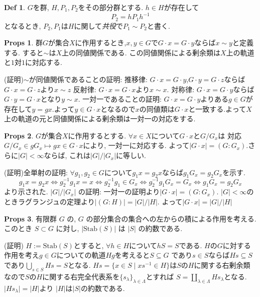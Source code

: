 \documentclass[dvipdfmx]{jsarticle}
\theoremstyle{definition}
\newtheorem{props}{Props}
\newtheorem{definition}{Def}
\numberwithin{equation}{section}
\numberwithin{props}{section}
\numberwithin{definition}{section}
\numberwithin{note}{section}
\newcommand{\Stab}{\mathrm{Stab}}
\begin{document}
\begin{definition}
     $G$を群, $H,P_1,P_2$をその部分群とする. $h\in H$が存在して
     $$
          P_2=hP_1h^{-1}
     $$
     となるとき, $P_2,P_1$は$H$に関して\emph{共役}で$P_1\sim P_2$と書く.
\end{definition}


\begin{props}
     群$G$が集合$X$に作用するとき,$x,y\in G$で$G\cdot x=G\cdot y$ならば$x\sim y$と定義する. すると$\sim$は$X$上の同値関係である. この同値関係による剰余類は$X$上の軌道と$1$対$1$に対応する.
\end{props}
(証明)$\sim$が同値関係であることの証明:
推移律:  $G\cdot x=G\cdot y$,$G\cdot y=G\cdot z$ならば$G\cdot x=G\cdot z$より$x\sim z$
反射律: $G\cdot x=G\cdot x$より$x\sim x$.
対称律: $G\cdot x=G\cdot y$ならば$G\cdot y=G\cdot x$となり$y\sim x$.
一対一であることの証明:
$G\cdot x=G\cdot y$よりある$g\in G$が存在して$y=gx$.よって$y\in G\cdot x$となるので$x$の同値類は$G\cdot x$と一致する.よって$X$上の軌道の元と同値関係による剰余類は一対一の対応をする.

\begin{props}
     $G$が集合$X$に作用するとする. $\forall x \in X$について$G\cdot x$と$G/G_x$は
     対応$G/G_x \in gG_x \mapsto gx\in G\cdot x$により, 一対一に対応する. よって$\lvert G\cdot x\rvert=(G:G_x)$.さらに$\lvert G\rvert<\infty$ならば, これは$\lvert G\rvert/\lvert G_x\rvert$に等しい.
\end{props}
(証明)全単射の証明:
$\forall g_1 ,g_2 \in G$について$g_1x=g_2x$ならば$g_1G_x=g_2G_x$を示す.
$$
     g_1x=g_2x \iff g^{-1}_2g_1 x =x\iff g^{-1}_2g_1\in G_x \iff g^{-1}_2g_1G_x=G_x \iff g_1G_x=g_2G_x
$$
より示された.
$\lvert G\rvert/\lvert G_x\rvert$ の証明:
一対一の証明より$\lvert G\cdot x\rvert=(G:G_x)$. $\lvert G\rvert<\infty$のときラグランジュの定理より$\lvert (G\colon H)\rvert = \lvert G\rvert/\lvert H\rvert$. よって$\lvert G\cdot x\rvert=\lvert G\rvert/\lvert H\rvert$

\begin{props}
     有限群 $G$ の, $G$ の部分集合の集合への左からの積による作用を考える. このとき $S\subset G$ に対し, $\lvert\Stab(S)\rvert$ は $|S|$ の約数である.
\end{props}
(証明)
$H:= \Stab(S)$とすると, $\forall h\in H$について$hS=S$である. $H$の$G$に対する作用を考え$g\in G$についての軌道$Hg$を考えると$S\subseteq G$ であり$s\in S$ならば$Hs\subseteq S$であり$\bigcup_{s\in S}Hs= S$となる. $Hs = \lbrace x\in S \mid xs^{-1}\in H\rbrace$は$S$の$H$に関する右剰余類なので$S$の$H$に関する右完全代表系を$\lbrace{s_\lambda}\rbrace_{\lambda\in\Lambda}$とすれば
$S = \coprod_{\lambda \in \Lambda}Hs_\lambda$となる. $\lvert Hs_\lambda\rvert=\lvert H\rvert$より $\lvert H\rvert$は$\lvert S\rvert$の約数である.
\end{document}
